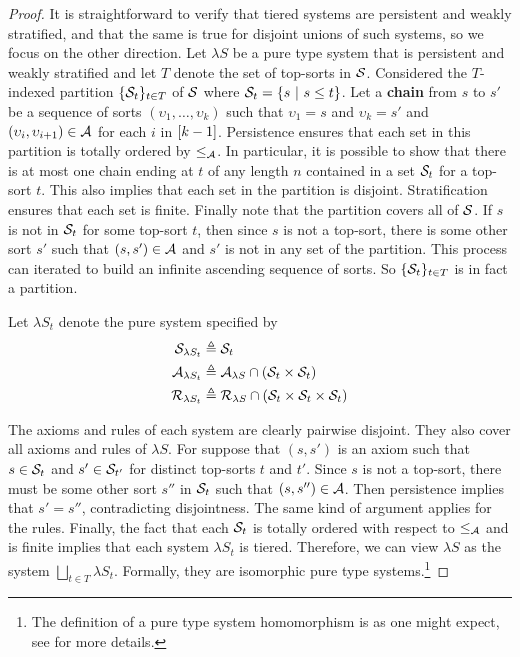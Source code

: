 \documentclass{article}
\begin{document}
\begin{proof}
It is straightforward to verify that tiered systems are persistent and weakly stratified, and that the same is true for disjoint unions of such systems, so we focus on the other direction.
Let $\lambda S$ be a pure type system that is persistent and weakly stratified and let $T$ denote the set of top-sorts in $\mathcal S$.
Considered the $T$-indexed partition $\{\mathcal S_t\}_{t \in T}$ of $\mathcal S$ where $\mathcal S_t = \{s \ | \ s \leq t\}$.
Let a \textbf{chain} from $s$ to $s'$ be a sequence of sorts $(\upsilon_1, \dots, \upsilon_k)$ such that $\upsilon_1 = s$ and $\upsilon_k = s'$ and $(\upsilon_i, \upsilon_{i + 1}) \in \mathcal A$ for each $i$ in $[k - 1]$.
Persistence ensures that each set in this partition is totally ordered by $\leq_\mathcal A$.
In particular, it is possible to show that there is at most one chain ending at $t$ of any length $n$ contained in a set $\mathcal S_t$ for a top-sort $t$.
This also implies that each set in the partition is disjoint.
Stratification ensures that each set is finite.
Finally note that the partition covers all of $\mathcal S$.
If $s$ is not in $\mathcal S_t$ for some top-sort $t$, then since $s$ is not a top-sort, there is some other sort $s'$ such that $(s, s') \in \mathcal A$ and $s'$ is not in any set of the partition. This process can iterated to build an infinite ascending sequence of sorts.
So $\{\mathcal S_t\}_{t \in T}$ is in fact a partition.

Let $\lambda S_t$ denote the pure system specified by
\begin{align*}
\mathcal S_{\lambda S_t} &\triangleq \mathcal S_t \\
\mathcal A_{\lambda S_t} &\triangleq \mathcal A_{\lambda S} \cap (\mathcal S_t \times \mathcal S_t) \\
\mathcal R_{\lambda S_t} &\triangleq \mathcal R_{\lambda S} \cap (\mathcal S_t \times \mathcal S_t \times \mathcal S_t)
\end{align*}

The axioms and rules of each system are clearly pairwise disjoint.
They also cover all axioms and rules of $\lambda S$.
For suppose that $(s, s')$ is an axiom such that $s \in \mathcal S_t$ and $s' \in \mathcal S_{t'}$ for distinct top-sorts $t$ and $t'$.
Since $s$ is not a top-sort, there must be some other sort $s''$ in $\mathcal S_t$ such that $(s, s'') \in \mathcal A$.
Then persistence implies that $s' = s''$, contradicting disjointness.
The same kind of argument applies for the rules.
Finally, the fact that each $\mathcal S_t$ is totally ordered with respect to $\leq_\mathcal A$ and is finite implies that each system $\lambda S_t$ is tiered.
Therefore, we can view $\lambda S$ as the system $\bigsqcup_{t \in T} \lambda S_t$.
Formally, they are isomorphic pure type systems.\footnote{The definition of a pure type system homomorphism is as one might expect, see \cite{roux-doorn-2014} for more details.}
\end{proof}
\end{document}
